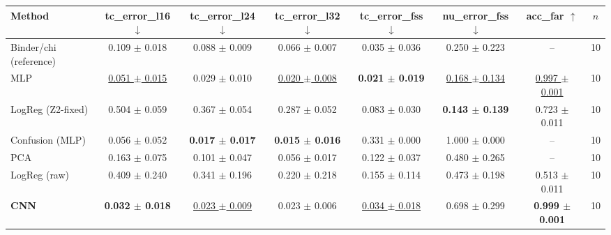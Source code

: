 \begin{tabular}{lccccccc}
\toprule
Method & tc\_error\_l16 $\downarrow$ & tc\_error\_l24 $\downarrow$ & tc\_error\_l32 $\downarrow$ & tc\_error\_fss $\downarrow$ & nu\_error\_fss $\downarrow$ & acc\_far $\uparrow$ & $n$ \\
\midrule
Binder/chi (reference) & 0.109 $\pm$ 0.018 & 0.088 $\pm$ 0.009 & 0.066 $\pm$ 0.007 & 0.035 $\pm$ 0.036 & 0.250 $\pm$ 0.223 & -- & 10 \\
MLP & \underline{0.051 $\pm$ 0.015} & 0.029 $\pm$ 0.010 & \underline{0.020 $\pm$ 0.008} & \textbf{0.021 $\pm$ 0.019} & \underline{0.168 $\pm$ 0.134} & \underline{0.997 $\pm$ 0.001} & 10 \\
LogReg (Z2-fixed) & 0.504 $\pm$ 0.059 & 0.367 $\pm$ 0.054 & 0.287 $\pm$ 0.052 & 0.083 $\pm$ 0.030 & \textbf{0.143 $\pm$ 0.139} & 0.723 $\pm$ 0.011 & 10 \\
Confusion (MLP) & 0.056 $\pm$ 0.052 & \textbf{0.017 $\pm$ 0.017} & \textbf{0.015 $\pm$ 0.016} & 0.331 $\pm$ 0.000 & 1.000 $\pm$ 0.000 & -- & 10 \\
PCA & 0.163 $\pm$ 0.075 & 0.101 $\pm$ 0.047 & 0.056 $\pm$ 0.017 & 0.122 $\pm$ 0.037 & 0.480 $\pm$ 0.265 & -- & 10 \\
LogReg (raw) & 0.409 $\pm$ 0.240 & 0.341 $\pm$ 0.196 & 0.220 $\pm$ 0.218 & 0.155 $\pm$ 0.114 & 0.473 $\pm$ 0.198 & 0.513 $\pm$ 0.011 & 10 \\
\textbf{CNN} & \textbf{0.032 $\pm$ 0.018} & \underline{0.023 $\pm$ 0.009} & 0.023 $\pm$ 0.006 & \underline{0.034 $\pm$ 0.018} & 0.698 $\pm$ 0.299 & \textbf{0.999 $\pm$ 0.001} & 10 \\
\bottomrule
\end{tabular}

